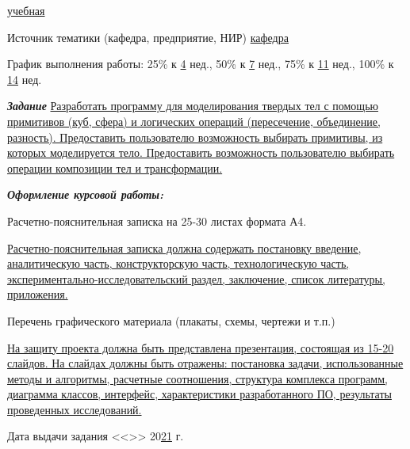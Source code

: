 \uline{\hfill учебная \hfill}

Источник тематики (кафедра, предприятие, НИР) \uline{\hfill кафедра \hfill}

График выполнения работы:  25\% к \uline{4} нед., 50\% к \uline{7} нед., 75\% к \uline{11} нед., 100\% к \uline{14} нед.

\textbf{\textit{Задание}}
\uline{Разработать программу для моделирования твердых тел с помощью примитивов (куб, сфера) и логических операций (пересечение, объединение, разность). 
Предоставить пользователю возможность выбирать примитивы, из которых моделируется тело. Предоставить возможность пользователю выбирать операции композиции тел и трансформации. 
    \hfill}

\textbf{\textit{Оформление курсовой работы:}}

Расчетно-пояснительная записка на 25-30  листах формата А4.

\uline{Расчетно-пояснительная записка должна содержать постановку введение, аналитическую часть, конструкторскую часть, технологическую часть, экспериментально-исследовательский раздел, заключение, список литературы, приложения.
    \hfill}

Перечень графического материала (плакаты, схемы, чертежи и т.п.)

\uline{На защиту проекта должна быть представлена презентация, состоящая из 15-20 слайдов. На слайдах должны быть отражены: постановка задачи, использованные методы и алгоритмы, расчетные соотношения, структура комплекса программ, диаграмма классов, интерфейс, характеристики разработанного ПО, результаты проведенных исследований.
    \hfill}

Дата выдачи задания
 <<\uline{\mbox{\hspace*{5mm}}}>> \uline{\mbox{\hspace*{2.5cm}}} 20\uline{21} г.

\endgroup

\vfill

